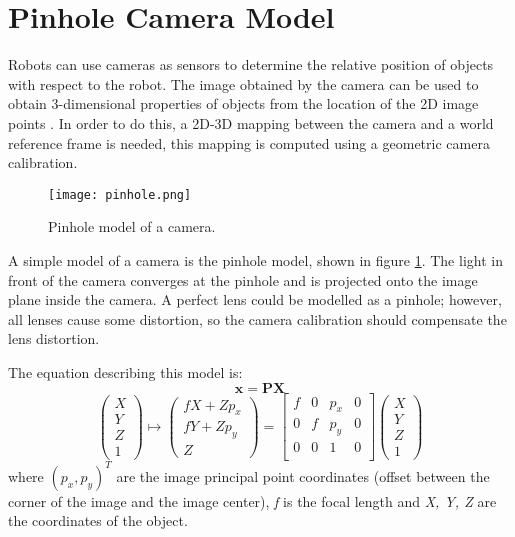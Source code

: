 \section{Pinhole Camera Model}

Robots can use cameras as sensors to determine the relative position of objects with respect to the robot. The image obtained by the camera can be used to obtain 3-dimensional properties of objects from the location of the 2D image points \citep{Camera}. In order to do this, a 2D-3D mapping between the camera and a world reference frame is needed, this mapping is computed using a geometric camera calibration.
\begin{figure}[H]
	\centering
	\texttt{[image: pinhole.png]}
	\vspace{-10pt}
	\caption{Pinhole model of a camera.}
	\vspace{-15pt}
	\label{fig:pinhole}
\end{figure}

A simple model of a camera is the pinhole model, shown in  figure \ref{fig:pinhole}. The light in front of the camera converges at the pinhole and is projected onto the image plane inside the camera. A perfect lens could be modelled as a pinhole; however, all lenses cause some distortion, so the camera calibration should compensate the lens distortion. 

The equation describing this model is:
\begin{equation}
\mathbf{x}= \mathbf{PX}
\end{equation}
\begin{equation}
\left( \begin{array}{c}
X \\
Y \\
Z \\
1
\end{array}
\right)	\mapsto 
\left( \begin{array}{c}
fX + Zp_{x} \\
fY + Zp_{y} \\
Z
\end{array}
\right) = \left[ \begin{array}{cccc}
f & 0 & p_{x} & 0 \\
0 & f & p_{y} & 0 \\
0 & 0 & 1 & 0 \\
\end{array}
\right] \left( \begin{array}{c}
X \\
Y \\
Z \\
1
\end{array}
\right)
\label{eq:pin_camera}
\end{equation}
where $( p_{x}, p_{y})^T$ are the image principal point coordinates (offset between the corner of the image and the image center), \textit{f} is the focal length and \textit{X, Y, Z} are the coordinates of the object.

